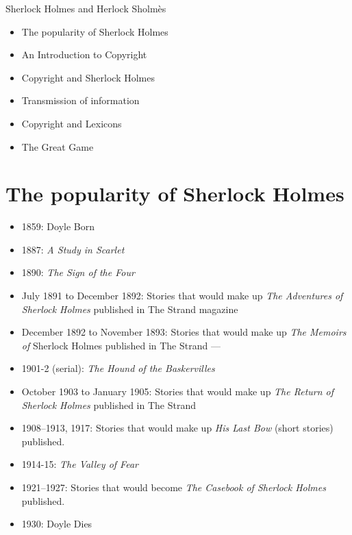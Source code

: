 \documentclass[a4paper,landscape,headrule,footrule,xetex]{foils}
\begin{document}
%
{Sherlock Holmes and Herlock Sholmès}
\maketitle

%



\begin{itemize}
\item The popularity of Sherlock Holmes
\item An Introduction to Copyright
\item Copyright and Sherlock Holmes
\item Transmission of information
\item Copyright and Lexicons
\item The Great Game
\end{itemize}


\section{The popularity of Sherlock Holmes}

\begin{itemize}\addtolength{\itemsep}{-1.5ex}
\item 1859: Doyle Born
\item 1887: \textit{A Study in Scarlet}
\item     1890: \textit{The Sign of the Four}
\item   July 1891 to December 1892: Stories that would make up \textit{The Adventures of Sherlock Holmes} published in The Strand magazine
\item    December 1892 to November 1893: Stories that would make up \textit{The Memoirs of} Sherlock Holmes published in The Strand   --- 
\item    1901-2 (serial): \textit{The Hound of the Baskervilles}
\item    October 1903 to January 1905: Stories that would make up \textit{The Return of Sherlock Holmes} published in The Strand
\item 1908–1913, 1917: Stories that would make up \textit{His Last Bow} (short stories) published.
\item     1914-15: \textit{The Valley of Fear}
\item  1921–1927: Stories that would become \textit{The Casebook of Sherlock Holmes} published. 
\item 1930: Doyle Dies
\end{itemize}
\end{document}
